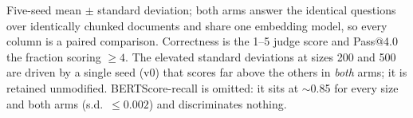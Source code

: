 \begin{table}[t]
\begin{tabular}{llccccccc}
\bottomrule
\end{tabular}
\parbox[t]{0.95\textwidth}{\vspace{0.1cm}Five-seed mean $\pm$ standard deviation; both arms answer the identical questions over identically chunked documents and share one embedding model, so every column is a paired comparison. Correctness is the 1--5 judge score and Pass@4.0 the fraction scoring $\geq 4$. The elevated standard deviations at sizes 200 and 500 are driven by a single seed (v0) that scores far above the others in \emph{both} arms; it is retained unmodified. BERTScore-recall is omitted: it sits at $\sim$0.85 for every size and both arms (s.d.\ $\leq 0.002$) and discriminates nothing.}
\end{table}
